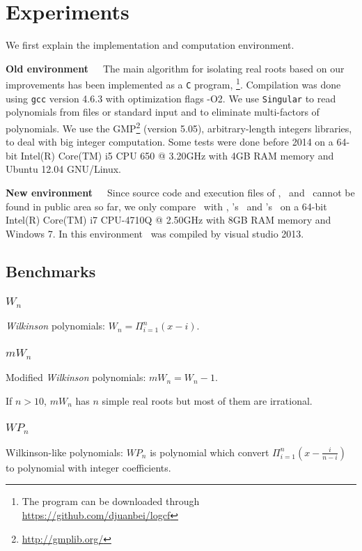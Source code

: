 
\section{Experiments}
\label{sec:exp}

We first explain the implementation and computation environment.

{\bf Old environment}\ \ \
The main algorithm for isolating real roots based on our improvements has been implemented as a \texttt{C} program, \froot \footnote{The program can be downloaded through \url{https://github.com/djuanbei/logcf}}. Compilation was done using {\tt gcc} version 4.6.3 with optimization flags -O2.
We use {\tt Singular} \cite{singular} to read polynomials from files or standard input and to eliminate multi-factors of polynomials. We use the GMP\footnote{ \url{http://gmplib.org/}}
(version 5.05), arbitrary-length integers libraries, to deal with big integer computation.
Some tests were done before 2014   on a 64-bit Intel(R) Core(TM) i5 CPU 650 @ 3.20GHz with 4GB RAM memory and Ubuntu 12.04 GNU/Linux.

{\bf New environment}\ \ \
Since   source code and execution files
	of    \eign, \cf\ and \sle\  cannot be found in public area so far, we only compare \froot\ with \AND, \MM's \inte\  and  \MAPLE's \REALROOT\  on   a 64-bit Intel(R) Core(TM) i7 CPU-4710Q @ 2.50GHz with 8GB RAM memory and Windows 7. In this environment \froot\ was compiled by visual studio 2013.

\subsection{Benchmarks }
 \subsubsection{$W_n$}
 {\it Wilkinson} polynomials: $W_n=\Pi_{i=1}^n(x-i)$. %
  \subsubsection{$mW_n$}
  Modified {\it Wilkinson} polynomials: $mW_n=W_n-1$.

  If $n>10$, $mW_n$ has $n$ simple real roots but most of them are irrational.
   \subsubsection{$WP_n$}
   Wilkinson-like polynomials: $WP_n$  is polynomial which convert $\Pi_{i=1}^n(x-\frac{i}{n-i})$ to polynomial with integer coefficients.   

